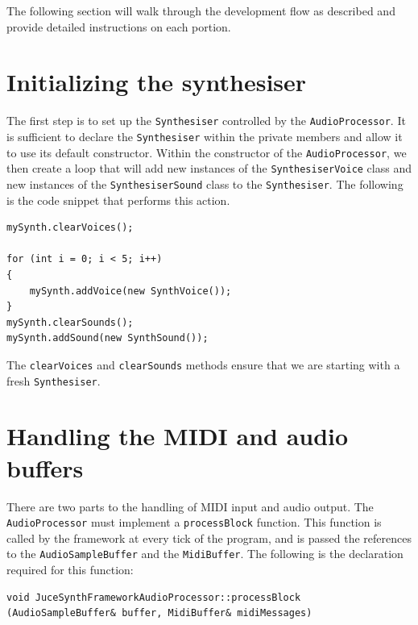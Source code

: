 \documentclass[a4paper,12pt]{report}
\begin{document}
The following section will walk through the development flow as described and provide detailed instructions on each portion.

\section{Initializing the synthesiser}
\label{sec:initializesynthesizer}
The first step is to set up the \texttt{Synthesiser} controlled by the \texttt{Audio\-Processor}. It is sufficient to declare the \texttt{Synthesiser} within the private members and allow it to use its default constructor. 
Within the constructor of the \texttt{Audio\-Processor}, we then create a loop that will add new instances of the \texttt{Synthesiser\-Voice} class and new instances of the \texttt{Synthesiser\-Sound} class to the \texttt{Synthesiser}. The following is the code snippet that performs this action.

 \noindent\begin{minipage}{\linewidth} \begin{lstlisting}[caption={Instantiating Voices},label={code:instantiatingvoices},captionpos=b]
mySynth.clearVoices();
    
for (int i = 0; i < 5; i++)
{
    mySynth.addVoice(new SynthVoice());
}
mySynth.clearSounds();
mySynth.addSound(new SynthSound());
\end{lstlisting}
\end{minipage}

The \texttt{clear\-Voices} and \texttt{clear\-Sounds} methods ensure that we are starting with a fresh \texttt{Synthesiser}.

\section{Handling the MIDI and audio buffers}
\label{sec:handlingbuffers}
There are two parts to the handling of MIDI input and audio output. The \texttt{Audio\-Processor} must implement a \texttt{process\-Block} function. This function is called by the framework at every tick of the program, and is passed the references to the \texttt{Audio\-Sample\-Buffer} and the \texttt{Midi\-Buffer}. The following is the declaration required for this function:

 \noindent\begin{minipage}{\linewidth} \begin{lstlisting}[caption={\texttt{processBlock} Declaration},label={code:processblockdeclaration},captionpos=b]
void JuceSynthFrameworkAudioProcessor::processBlock (AudioSampleBuffer& buffer, MidiBuffer& midiMessages)
\end{lstlisting} \end{minipage}
\end{document}
